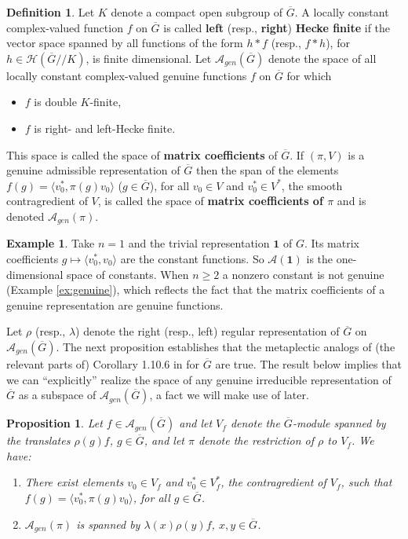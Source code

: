 \documentclass[12pt,letterpaper,reqno]{amsart}
\let\cal\mathcal
\newtheorem{proposition}[theorem]{Proposition}
\theoremstyle{definition}
\newtheorem{definition}[theorem]{Definition}
\newtheorem{example}[theorem]{Example}
\theoremstyle{remark}
\numberwithin{equation}{section}
\begin{document}
\begin{definition}
\label{def:13}
Let $K$ denote a compact open subgroup of $\overline{G}$. A locally constant
complex-valued function $f$ on $\overline{G}$ is called \textbf{left} (resp.,
\textbf{right}) \textbf{Hecke finite} if the vector space spanned by all
functions of the form $h*f$ (resp., $f*h$), for
$h\in {\cal H}(\overline{G}//K)$, is finite dimensional. Let
${\cal A}_{gen}(\overline{G})$ denote the space of all locally constant
complex-valued genuine functions $f$ on $\overline{G}$ for which
\begin{itemize}
\item $f$ is double $K$-finite,
\item $f$ is right- and left-Hecke finite.
\end{itemize}
This space is called the space of \textbf{matrix coefficients} of
$\overline{G}$. If $(\pi,V)$ is a genuine admissible representation of
$\overline{G}$ then the span of the elements
$f(g)=\langle v_0^*,\pi(g)v_0\rangle$ ($g\in \overline{G}$), for all
$v_0\in V$ and $v_0^*\in V^*$, the smooth contragredient of $V$, is called the
space of \textbf{matrix coefficients of $\pi$} and is denoted
${\cal A}_{gen}(\pi)$.
\end{definition}

\begin{example}
\label{ex:def13}
Take $n=1$ and the trivial representation $\mathbf{1}$ of $G$. Its matrix
coefficients $g\mapsto\langle v_0^*,v_0\rangle$ are the constant functions.
So ${\cal A}(\mathbf{1})$ is the one-dimensional space of constants. When
$n\ge 2$ a nonzero constant is not genuine (Example \ref{ex:genuine}), which
reflects the fact that the matrix coefficients of a genuine representation
are genuine functions.
\end{example}

Let $\rho$ (resp., $\lambda$) denote the right (resp., left) regular
representation of $\overline{G}$ on ${\cal A}_{gen}(\overline{G})$. The next
proposition establishes that the metaplectic analogs of (the relevant parts
of) Corollary 1.10.6 in \cite{Si79} for $\overline{G}$ are true. The result
below implies that we can ``explicitly'' realize the space of any genuine
irreducible representation of $\overline{G}$ as a subspace of
${\cal A}_{gen}(\overline{G})$, a fact we will make use of later.

\begin{proposition}
\label{prop:silberger}
Let $f\in {\cal A}_{gen}(\overline{G})$ and let $V_f$ denote the
$\overline{G}$-module spanned by the translates $\rho(g)f$, $g\in \overline{G}$,
and let $\pi$ denote the restriction of $\rho$ to $V_f$. We have:
\begin{enumerate}
\item[(a)] There exist elements $v_0\in V_f$ and $v_0^*\in V_f^*$, the
contragredient of $V_f$, such that $f(g)=\langle v_0^*,\pi(g)v_0\rangle$, for
all $g\in \overline{G}$.
\item[(b)] ${\cal A}_{gen}(\pi)$ is spanned by $\lambda(x)\rho(y)f$,
$x,y\in \overline{G}$.
\end{enumerate}
\end{proposition}
\end{document}
